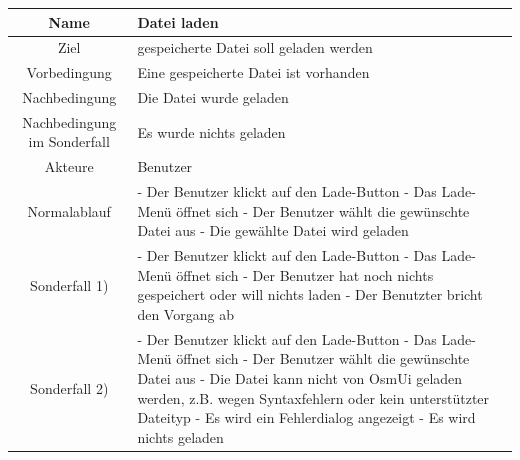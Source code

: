 \documentclass[a4paper,10pt]{scrartcl}
\begin{document}
\begin{tabular}{|c|p{10cm}|}
\hline Name & \textbf{Datei laden} \\ 
\hline Ziel & gespeicherte Datei soll geladen werden \\ 
\hline Vorbedingung & Eine gespeicherte Datei ist vorhanden \\ 
\hline Nachbedingung & Die Datei wurde geladen \\ 
\hline Nachbedingung im Sonderfall & Es wurde nichts geladen \\ 
\hline Akteure & Benutzer \\ 
\hline Normalablauf & - Der Benutzer klickt auf den Lade-Button
\newline 
- Das Lade-Menü öffnet sich
\newline 
- Der Benutzer wählt die gewünschte Datei aus
\newline 
- Die gewählte Datei wird geladen
\\ 
\hline Sonderfall 1)&  
 - Der Benutzer klickt auf den Lade-Button
 \newline
 - Das Lade-Menü öffnet sich
 \newline
 - Der Benutzer hat noch nichts gespeichert oder will nichts laden
 \newline
 - Der Benutzter bricht den Vorgang ab
\\
\hline Sonderfall 2)&
 - Der Benutzer klickt auf den Lade-Button
 \newline
 - Das Lade-Menü öffnet sich
 \newline
 - Der Benutzer wählt die gewünschte Datei aus
 \newline
 - Die Datei kann nicht von OsmUi geladen werden, z.B. wegen Syntaxfehlern oder kein unterstützter Dateityp
 \newline
 - Es wird ein Fehlerdialog angezeigt
 \newline
 - Es wird nichts geladen
\\
\hline 
\end{tabular} 
\\
\\
\end{document}
